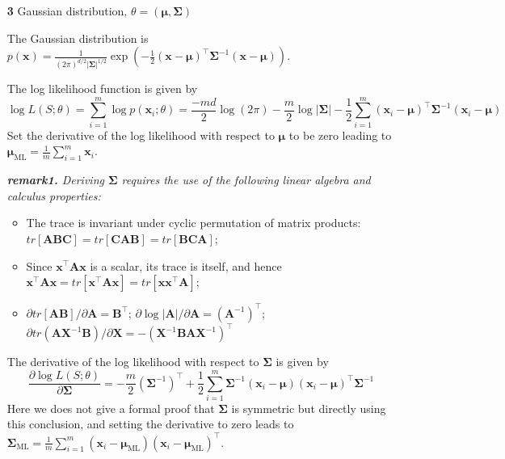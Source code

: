 \documentclass{article}
\begin{document}
\begin{itemize}
	\item [\textbf{3}] Gaussian distribution, $\theta=(\bm{\mu},\bm{\Sigma})$
	
	The Gaussian distribution is  $p(\bm{x}) = \frac{1}{(2\pi)^{d/2} |\bm{\Sigma}|^{1/2}} \exp \left( -\frac{1}{2} (\bm{x} - \bm{\mu})^\top \bm{\Sigma}^{-1} (\bm{x} - \bm{\mu})\right)$.
	
	The log likelihood function is given by
	\begin{equation*}
	\log L(S;\theta) = \sum_{i=1}^m \log p(\bm{x}_i;\theta) 
	= \frac{-md}{2} \log (2\pi) - \frac{m}{2}\log |\bm{\Sigma}| - \frac{1}{2} \sum_{i=1}^m (\bm{x}_i - \bm{\mu})^\top \bm{\Sigma}^{-1} (\bm{x}_i - \bm{\mu})
	\end{equation*}
	Set the derivative of the log likelihood with respect to $\bm{\mu}$ to be zero leading to $\bm{\mu}_{\mathrm{ML}}= \frac{1}{m} \sum_{i=1}^m \bm{x}_i$.
	
	\begin{framed}
	\begin{scriptsize}
	\begin{spacing}{1.2}
	\noindent\textit{\textbf{remark1.} Deriving $\bm{\Sigma}$ requires the use of the following linear algebra and calculus properties:}
	\begin{itemize}
	\item The trace is invariant under cyclic permutation of matrix products: $tr[\bm{A}\bm{B}\bm{C}]=tr[\bm{C}\bm{A}\bm{B}]=tr[\bm{B}\bm{C}\bm{A}]$;
	\item Since $\bm{x}^\top \bm{A} \bm{x}$ is a scalar, its trace is itself, and hence $\bm{x}^\top \bm{A} \bm{x} = tr[\bm{x}^\top \bm{A} \bm{x}] = tr[\bm{x} \bm{x}^\top \bm{A}]$;
	\item $\partial tr[\bm{A} \bm{B}]/\partial \bm{A} = \bm{B}^\top$; $\partial \log |\bm{A}|/\partial \bm{A} = (\bm{A}^{-1})^\top$; $\partial tr(\bm{A}\bm{X}^{-1}\bm{B})/\partial \bm{X} = -(\bm{X}^{-1} \bm{BA}\bm{X}^{-1})^\top$
	\end{itemize}
	\end{spacing}
	\end{scriptsize}
	\end{framed}

	The derivative of the log likelihood with respect to $\bm{\Sigma}$ is given by
	\begin{equation*}
	\frac{\partial \log L(S;\theta)}{\partial \bm{\Sigma}} = -\frac{m}{2} (\bm{\Sigma}^{-1})^\top + \frac{1}{2} \sum_{i=1}^m  \bm{\Sigma}^{-1} (\bm{x}_i - \bm{\mu})(\bm{x}_i - \bm{\mu})^\top \bm{\Sigma}^{-1}
	\end{equation*}
Here we does not give a formal proof that $\bm{\Sigma}$ is symmetric but directly using this conclusion, and setting the derivative to zero leads to $\bm{\Sigma}_{\mathrm{ML}} = \frac{1}{m} \sum_{i=1}^m (\bm{x}_i - \bm{\mu}_{\mathrm{ML}})(\bm{x}_i - \bm{\mu}_{\mathrm{ML}})^\top $.
	

\end{itemize}
\end{document}
